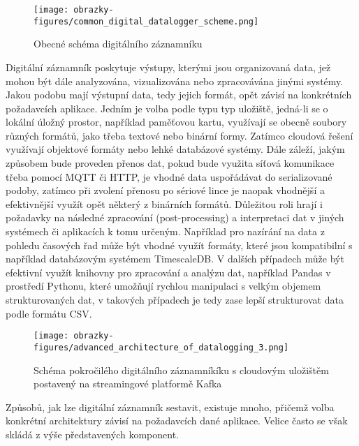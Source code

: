 \begin{figure}[h]
    \centering
    \texttt{[image: obrazky-figures/common\_digital\_datalogger\_scheme.png]}
    \caption{Obecné schéma digitálního záznamníku}
    \label{fig:common-digital-datalogger}
\end{figure}

Digitální záznamník poskytuje výstupy, kterými jsou organizovaná data, jež mohou být dále analyzována, vizualizována nebo 
zpracovávána jinými systémy. Jakou podobu mají výstupní data, tedy jejich formát, opět závisí na konkrétních požadavcích aplikace. 
Jedním je volba podle typu typ uložiště, jedná-li se o lokální úložný prostor, například paměťovou kartu, využívají se obecně 
soubory různých formátů, jako třeba textové nebo binární formy. Zatímco cloudová řešení využívají objektové formáty nebo lehké 
databázové systémy. Dále záleží, jakým způsobem bude proveden přenos dat, pokud bude využita síťová komunikace třeba pomocí MQTT 
či HTTP, je vhodné data uspořádávat do serializované podoby, zatímco při zvolení přenosu po sériové lince je naopak vhodnější a 
efektivnější využít opět některý z binárních formátů. Důležitou roli hrají i požadavky na následné zpracování (post-processing) a 
interpretaci dat v jiných systémech či aplikacích k tomu určeným. Například pro nazírání na data z pohledu časových řad může být 
vhodné využít formáty, které jsou kompatibilní s například databázovým systémem TimescaleDB. V dalších případech může být efektivní 
využít knihovny pro zpracování a analýzu dat, například Pandas v prostředí Pythonu, které umožňují rychlou manipulaci s velkým 
objemem strukturovaných dat, v takových případech je tedy zase lepší strukturovat data podle formátu CSV. 
\cite{medium_optimalization_iot_data_storage_timescaledb}

\newpage

\begin{figure}[h]
    \centering
    \texttt{[image: obrazky-figures/advanced\_architecture\_of\_datalogging\_3.png]}
    
    \caption{Schéma pokročilého digitálního záznamníkíku s cloudovým uložištěm postavený na streamingové platformě Kafka \cite{confluent_advanced_datalogging, influxdata_advanced_datalogging_mmqt}}
    \label{fig:advanced-architecture-of-datalogging}
\end{figure}


Způsobů, jak lze digitální záznamník sestavit, existuje mnoho, přičemž volba konkrétní architektury závisí na požadavcích dané 
aplikace. Velice často se však skládá z výše představených komponent. 

